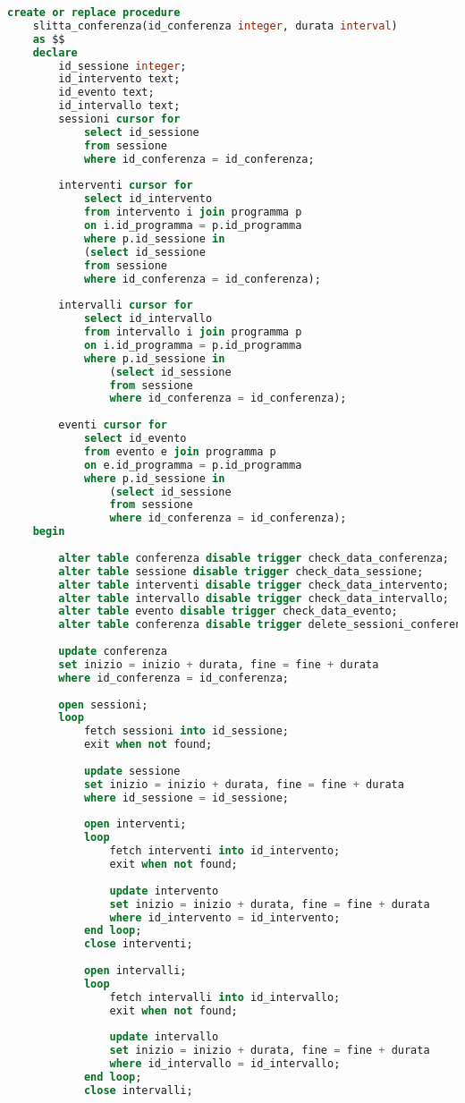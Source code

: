 \begin{lstlisting}[language=SQL,style=mystyle]
	create or replace procedure 
	slitta_conferenza(id_conferenza integer, durata interval)
	as $$
	declare
		id_sessione integer;
		id_intervento text;
		id_evento text;
		id_intervallo text;
		sessioni cursor for 
			select id_sessione 
			from sessione 
			where id_conferenza = id_conferenza;
			
		interventi cursor for
			select id_intervento 
			from intervento i join programma p 
			on i.id_programma = p.id_programma 
			where p.id_sessione in 
			(select id_sessione 
			from sessione 
			where id_conferenza = id_conferenza);
			
		intervalli cursor for
			select id_intervallo 
			from intervallo i join programma p 
			on i.id_programma = p.id_programma 
			where p.id_sessione in 
				(select id_sessione 
				from sessione 
				where id_conferenza = id_conferenza);
				
		eventi cursor for
			select id_evento 
			from evento e join programma p 
			on e.id_programma = p.id_programma 
			where p.id_sessione in 
				(select id_sessione 
				from sessione 
				where id_conferenza = id_conferenza);
	begin
	
		alter table conferenza disable trigger check_data_conferenza;
		alter table sessione disable trigger check_data_sessione;
		alter table interventi disable trigger check_data_intervento;
		alter table intervallo disable trigger check_data_intervallo;
		alter table evento disable trigger check_data_evento;
		alter table conferenza disable trigger delete_sessioni_conferenza;
		
		update conferenza
		set inizio = inizio + durata, fine = fine + durata
		where id_conferenza = id_conferenza;
	
		open sessioni;
		loop
			fetch sessioni into id_sessione;
			exit when not found;
			
			update sessione
			set inizio = inizio + durata, fine = fine + durata
			where id_sessione = id_sessione;
		
			open interventi;
			loop
				fetch interventi into id_intervento;
				exit when not found;
	
				update intervento
				set inizio = inizio + durata, fine = fine + durata
				where id_intervento = id_intervento;
			end loop;
			close interventi;
			
			open intervalli;
			loop
				fetch intervalli into id_intervallo;
				exit when not found;
	
				update intervallo
				set inizio = inizio + durata, fine = fine + durata
				where id_intervallo = id_intervallo;
			end loop;
			close intervalli;
			

\end{lstlisting}
